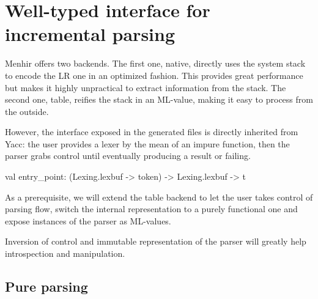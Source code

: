 \documentclass[twoside,a4paper]{article}
\begin{document}
\section{Well-typed interface for incremental parsing}



Menhir offers two backends.  The first one, native, directly uses the system
stack to encode the LR one in an optimized fashion.  This provides great
performance but makes it highly unpractical to extract information from the
stack.  The second one, table, reifies the stack in an ML-value, making it easy
to process from the outside.


However, the interface exposed in the generated files is directly inherited
from Yacc: the user provides a lexer by the mean of an impure function, then
the parser grabs control until eventually producing a result or failing.

  val entry\_point: (Lexing.lexbuf -> token) -> Lexing.lexbuf -> t

As a prerequisite, we will extend the table backend to let the user takes
control of parsing flow, switch the internal representation to a purely
functional one and expose instances of the parser as ML-values.

Inversion of control and immutable representation of the parser will greatly
help introspection and manipulation.


\subsection{Pure parsing}


\end{document}
